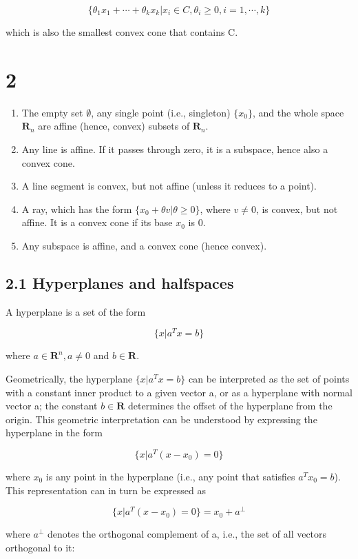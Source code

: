 \documentclass{article}
\begin{document}
\[
\{\theta_1x_1+\cdots+\theta_kx_k|x_i\in C,\theta_i\ge 0,i=1,\cdots,k\}    
\]

which is also the smallest convex cone that contains C.

\section*{2}

\begin{enumerate}
    \item The empty set $\emptyset$, any single point (i.e., singleton) $\{x_0\}$, and the whole space
    $\mathbf{R}_n$ are affine (hence, convex) subsets of $\mathbf{R}_n$.
    \item Any line is affine. If it passes through zero, it is a subspace, hence also a
    convex cone.
    \item A line segment is convex, but not affine (unless it reduces to a point).
    \item A ray, which has the form $\{x_0+\theta v|\theta\ge0\}$, where $v\ne0$, is convex, but not
    affine. It is a convex cone if its base $x_0$ is 0.
    \item Any subspace is affine, and a convex cone (hence convex).
\end{enumerate}

\subsection*{2.1 Hyperplanes and halfspaces}

A hyperplane is a set of the form

\[
    \{x|a^Tx=b\}
\]

where $a\in \mathbf{R}^n, a\ne0$ and $b\in\mathbf{R}$.

Geometrically,
the hyperplane $\{x|a^Tx=b\}$ can be interpreted as the set of points with a
constant inner product to a given vector a, or as a hyperplane with normal vector
a; the constant $b\in \mathbf{R}$ determines the offset of the hyperplane from the origin. This
geometric interpretation can be understood by expressing the hyperplane in the form

\[
    \{x|a^T(x-x_0)=0\}
\]

where $x_0$ is any point in the hyperplane (i.e., any point that satisfies $a^T x_0=b$).
This representation can in turn be expressed as

\[
    \{x|a^T(x-x_0)=0\}=x_0+a^\perp     
\]

where $a^\perp$ denotes the orthogonal complement of a, i.e., the set of all vectors orthogonal
to it:
\end{document}
